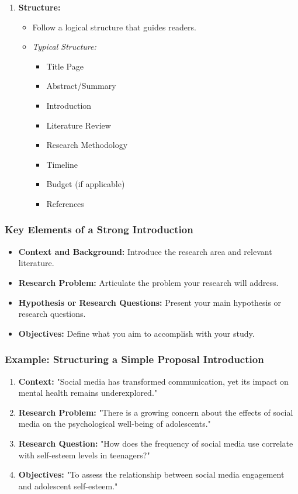 \documentclass[aspectratio=169]{beamer}
\begin{document}
\begin{frame}[fragile]
\begin{enumerate}
        \item \textbf{Structure:}
        \begin{itemize}
            \item Follow a logical structure that guides readers.
            \item \textit{Typical Structure:}
            \begin{itemize}
                \item Title Page
                \item Abstract/Summary
                \item Introduction
                \item Literature Review
                \item Research Methodology
                \item Timeline
                \item Budget (if applicable)
                \item References
            \end{itemize}
        \end{itemize}
    \end{enumerate}
\end{frame}

\begin{frame}[fragile]
    \frametitle{Key Elements of a Strong Introduction}
    \begin{itemize}
        \item \textbf{Context and Background:} Introduce the research area and relevant literature.
        \item \textbf{Research Problem:} Articulate the problem your research will address.
        \item \textbf{Hypothesis or Research Questions:} Present your main hypothesis or research questions.
        \item \textbf{Objectives:} Define what you aim to accomplish with your study.
    \end{itemize}
\end{frame}

\begin{frame}[fragile]
    \frametitle{Example: Structuring a Simple Proposal Introduction}
    \begin{enumerate}
        \item \textbf{Context:} "Social media has transformed communication, yet its impact on mental health remains underexplored."
        \item \textbf{Research Problem:} "There is a growing concern about the effects of social media on the psychological well-being of adolescents."
        \item \textbf{Research Question:} "How does the frequency of social media use correlate with self-esteem levels in teenagers?"
        \item \textbf{Objectives:} "To assess the relationship between social media engagement and adolescent self-esteem."
    \end{enumerate}
\end{frame}
\end{document}
